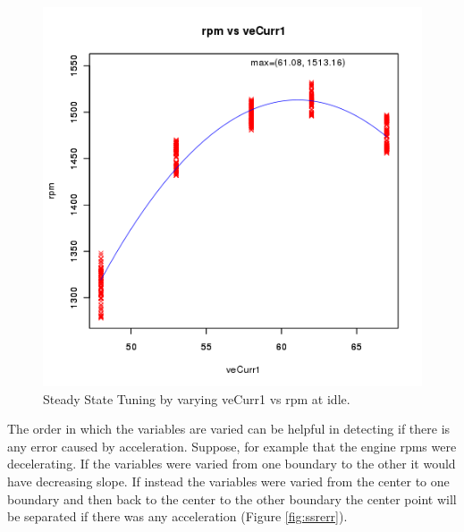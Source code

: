 \documentclass{article}
\begin{document}
\begin{figure}[tbp]
\center
\includegraphics[scale=0.5]{plot01}
\caption{Steady State Tuning by varying veCurr1 vs rpm at idle.}
\label{fig:sstrpm}
\end{figure}

The order in which the variables are varied can be helpful in detecting
if there is any error caused by acceleration.
Suppose, for example that the engine rpms were decelerating.
If the variables were varied from one boundary to the other it would have
decreasing slope.
If instead the variables were varied from the center to one boundary and then
back to the center to the other boundary the center point will be
separated if there was any acceleration (Figure \ref{fig:ssrerr}).
\end{document}
